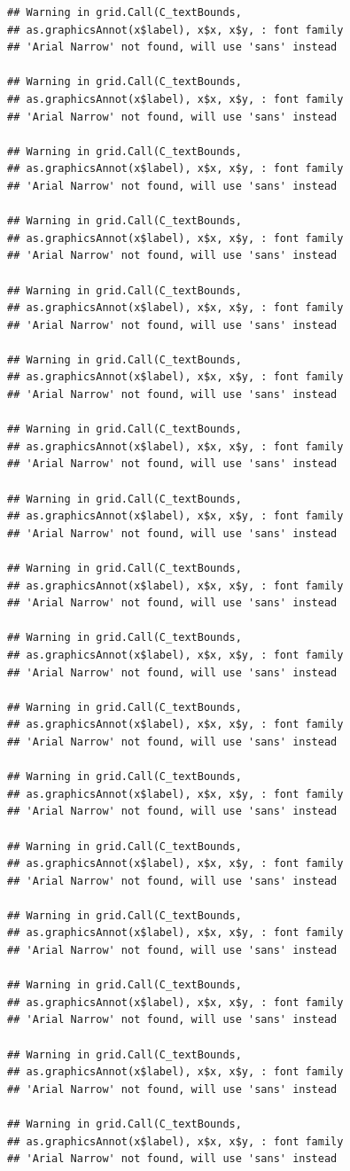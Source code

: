 \documentclass[]{krantz}
\begin{document}
\begin{verbatim}
## Warning in grid.Call(C_textBounds,
## as.graphicsAnnot(x$label), x$x, x$y, : font family
## 'Arial Narrow' not found, will use 'sans' instead

## Warning in grid.Call(C_textBounds,
## as.graphicsAnnot(x$label), x$x, x$y, : font family
## 'Arial Narrow' not found, will use 'sans' instead

## Warning in grid.Call(C_textBounds,
## as.graphicsAnnot(x$label), x$x, x$y, : font family
## 'Arial Narrow' not found, will use 'sans' instead

## Warning in grid.Call(C_textBounds,
## as.graphicsAnnot(x$label), x$x, x$y, : font family
## 'Arial Narrow' not found, will use 'sans' instead

## Warning in grid.Call(C_textBounds,
## as.graphicsAnnot(x$label), x$x, x$y, : font family
## 'Arial Narrow' not found, will use 'sans' instead

## Warning in grid.Call(C_textBounds,
## as.graphicsAnnot(x$label), x$x, x$y, : font family
## 'Arial Narrow' not found, will use 'sans' instead

## Warning in grid.Call(C_textBounds,
## as.graphicsAnnot(x$label), x$x, x$y, : font family
## 'Arial Narrow' not found, will use 'sans' instead

## Warning in grid.Call(C_textBounds,
## as.graphicsAnnot(x$label), x$x, x$y, : font family
## 'Arial Narrow' not found, will use 'sans' instead

## Warning in grid.Call(C_textBounds,
## as.graphicsAnnot(x$label), x$x, x$y, : font family
## 'Arial Narrow' not found, will use 'sans' instead

## Warning in grid.Call(C_textBounds,
## as.graphicsAnnot(x$label), x$x, x$y, : font family
## 'Arial Narrow' not found, will use 'sans' instead

## Warning in grid.Call(C_textBounds,
## as.graphicsAnnot(x$label), x$x, x$y, : font family
## 'Arial Narrow' not found, will use 'sans' instead

## Warning in grid.Call(C_textBounds,
## as.graphicsAnnot(x$label), x$x, x$y, : font family
## 'Arial Narrow' not found, will use 'sans' instead

## Warning in grid.Call(C_textBounds,
## as.graphicsAnnot(x$label), x$x, x$y, : font family
## 'Arial Narrow' not found, will use 'sans' instead

## Warning in grid.Call(C_textBounds,
## as.graphicsAnnot(x$label), x$x, x$y, : font family
## 'Arial Narrow' not found, will use 'sans' instead

## Warning in grid.Call(C_textBounds,
## as.graphicsAnnot(x$label), x$x, x$y, : font family
## 'Arial Narrow' not found, will use 'sans' instead

## Warning in grid.Call(C_textBounds,
## as.graphicsAnnot(x$label), x$x, x$y, : font family
## 'Arial Narrow' not found, will use 'sans' instead

## Warning in grid.Call(C_textBounds,
## as.graphicsAnnot(x$label), x$x, x$y, : font family
## 'Arial Narrow' not found, will use 'sans' instead
\end{verbatim}
\end{document}
